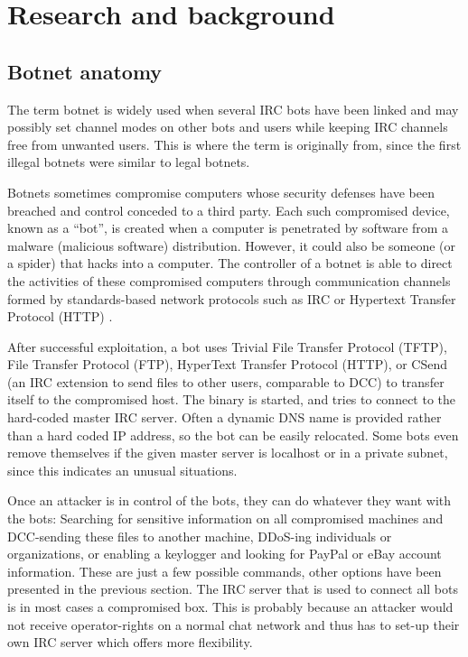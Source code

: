 \documentclass[]{article}
\begin{document}
\section{Research and background}

\subsection{Botnet anatomy}

The term botnet is widely used when several IRC bots have been linked and may possibly set channel modes on other bots and users while keeping IRC channels free from unwanted users. This is where the term is originally from, since the first illegal botnets were similar to legal botnets.

Botnets sometimes compromise computers whose security defenses have been breached and control conceded to a third party. Each such compromised device, known as a “bot”, is created when a computer is penetrated by software from a malware (malicious software) distribution. However, it could also be someone (or a spider) that hacks into a computer. The controller of a botnet is able to direct the activities of these compromised computers through communication channels formed by standards-based network protocols such as IRC or Hypertext Transfer Protocol (HTTP) \cite{article:sans}.

After successful exploitation, a bot uses Trivial File Transfer Protocol (TFTP), File Transfer Protocol (FTP), HyperText Transfer Protocol (HTTP), or CSend (an IRC extension to send files to other users, comparable to DCC) to transfer itself to the compromised host. The binary is started, and tries to connect to the hard-coded master IRC server. Often a dynamic DNS name is provided rather than a hard coded IP address, so the bot can be easily relocated. Some bots even remove themselves if the given master server is localhost or in a private subnet, since this indicates an unusual situations. 

Once an attacker is in control of the bots, they can do whatever they want with the bots: Searching for sensitive information on all compromised machines and DCC-sending these files to another machine, DDoS-ing individuals or organizations, or enabling a keylogger and looking for PayPal or eBay account information. These are just a few possible commands, other options have been presented in the previous section. The IRC server that is used to connect all bots is in most cases a compromised box. This is probably because an attacker would not receive operator-rights on a normal chat network and thus has to set-up their own IRC server which offers more flexibility.
\end{document}

